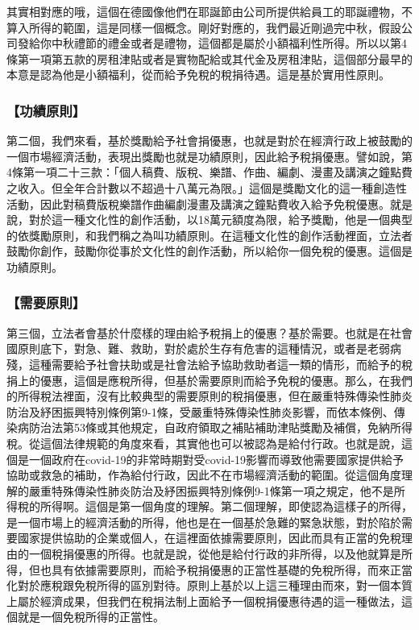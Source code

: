 \documentclass[oneside,sub3section]{ctexbook}
\begin{document}
其實相對應的哦，這個在德國像他們在耶誕節由公司所提供給員工的耶誕禮物，不算入所得的範圍，這是同樣一個概念。剛好對應的，我們最近剛過完中秋，假設公司發給你中秋禮節的禮金或者是禮物，這個都是屬於小額福利性所得。所以以第4條第一項第五款的房租津貼或者是實物配給或其代金及房租津貼，這個部分最早的本意是認為他是小額福利，從而給予免稅的稅捐待遇。這是基於實用性原則。

\hypertarget{ux529fux7e3eux539fux5247}{%
\subsubsection{【功績原則】}\label{ux529fux7e3eux539fux5247}}

第二個，我們來看，基於獎勵給予社會捐優惠，也就是對於在經濟行政上被鼓勵的一個市場經濟活動，表現出獎勵也就是功績原則，因此給予稅捐優惠。譬如說，第4條第一項二十三款：「個人稿費、版稅、樂譜、作曲、編劇、漫畫及講演之鐘點費之收入。但全年合計數以不超過十八萬元為限。」這個是獎勵文化的這一種創造性活動，因此對稿費版稅樂譜作曲編劇漫畫及講演之鐘點費收入給予免稅優惠。就是說，對於這一種文化性的創作活動，以18萬元額度為限，給予獎勵，他是一個典型的依獎勵原則，和我們稱之為叫功績原則。在這種文化性的創作活動裡面，立法者鼓勵你創作，鼓勵你從事於文化性的創作活動，所以給你一個免稅的優惠。這個是功績原則。

\hypertarget{ux9700ux8981ux539fux5247}{%
\subsubsection{【需要原則】}\label{ux9700ux8981ux539fux5247}}

第三個，立法者會基於什麼樣的理由給予稅捐上的優惠？基於需要。也就是在社會國原則底下，對急、難、救助，對於處於生存有危害的這種情況，或者是老弱病殘，這種需要給予社會扶助或是社會法給予協助救助者這一類的情形，而給予的稅捐上的優惠，這個是應稅所得，但基於需要原則而給予免稅的優惠。那么，在我們的所得稅法裡面，沒有比較典型的需要原則的稅捐優惠，但在嚴重特殊傳染性肺炎防治及紓困振興特別條例第9-1條，受嚴重特殊傳染性肺炎影響，而依本條例、傳染病防治法第53條或其他規定，自政府領取之補貼補助津貼獎勵及補償，免納所得稅。從這個法律規範的角度來看，其實他也可以被認為是給付行政。也就是說，這個是一個政府在covid-19的非常時期對受covid-19影響而導致他需要國家提供給予協助或救急的補助，作為給付行政，因此不在市場經濟活動的範圍。從這個角度理解的嚴重特殊傳染性肺炎防治及紓困振興特別條例9-1條第一項之規定，他不是所得稅的所得啊。這個是第一個角度的理解。第二個理解，即使認為這樣子的所得，是一個市場上的經濟活動的所得，他也是在一個基於急難的緊急狀態，對於陷於需要國家提供協助的企業或個人，在這裡面依據需要原則，因此而具有正當的免稅理由的一個稅捐優惠的所得。也就是說，從他是給付行政的非所得，以及他就算是所得，但也具有依據需要原則，而給予稅捐優惠的正當性基礎的免稅所得，而來正當化對於應稅跟免稅所得的區別對待。原則上基於以上這三種理由而來，對一個本質上屬於經濟成果，但我們在稅捐法制上面給予一個稅捐優惠待遇的這一種做法，這個就是一個免稅所得的正當性。
\end{document}
